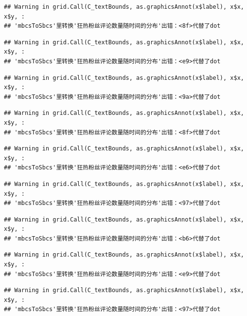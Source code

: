 \documentclass[
]{article}
\begin{document}
\begin{verbatim}
## Warning in grid.Call(C_textBounds, as.graphicsAnnot(x$label), x$x, x$y, :
## 'mbcsToSbcs'里转换'狂热粉丝评论数量随时间的分布'出错：<8f>代替了dot
\end{verbatim}

\begin{verbatim}
## Warning in grid.Call(C_textBounds, as.graphicsAnnot(x$label), x$x, x$y, :
## 'mbcsToSbcs'里转换'狂热粉丝评论数量随时间的分布'出错：<e9>代替了dot
\end{verbatim}

\begin{verbatim}
## Warning in grid.Call(C_textBounds, as.graphicsAnnot(x$label), x$x, x$y, :
## 'mbcsToSbcs'里转换'狂热粉丝评论数量随时间的分布'出错：<9a>代替了dot
\end{verbatim}

\begin{verbatim}
## Warning in grid.Call(C_textBounds, as.graphicsAnnot(x$label), x$x, x$y, :
## 'mbcsToSbcs'里转换'狂热粉丝评论数量随时间的分布'出错：<8f>代替了dot
\end{verbatim}

\begin{verbatim}
## Warning in grid.Call(C_textBounds, as.graphicsAnnot(x$label), x$x, x$y, :
## 'mbcsToSbcs'里转换'狂热粉丝评论数量随时间的分布'出错：<e6>代替了dot
\end{verbatim}

\begin{verbatim}
## Warning in grid.Call(C_textBounds, as.graphicsAnnot(x$label), x$x, x$y, :
## 'mbcsToSbcs'里转换'狂热粉丝评论数量随时间的分布'出错：<97>代替了dot
\end{verbatim}

\begin{verbatim}
## Warning in grid.Call(C_textBounds, as.graphicsAnnot(x$label), x$x, x$y, :
## 'mbcsToSbcs'里转换'狂热粉丝评论数量随时间的分布'出错：<b6>代替了dot
\end{verbatim}

\begin{verbatim}
## Warning in grid.Call(C_textBounds, as.graphicsAnnot(x$label), x$x, x$y, :
## 'mbcsToSbcs'里转换'狂热粉丝评论数量随时间的分布'出错：<e9>代替了dot
\end{verbatim}

\begin{verbatim}
## Warning in grid.Call(C_textBounds, as.graphicsAnnot(x$label), x$x, x$y, :
## 'mbcsToSbcs'里转换'狂热粉丝评论数量随时间的分布'出错：<97>代替了dot
\end{verbatim}
\end{document}
